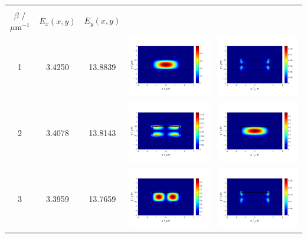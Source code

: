 \documentclass{assignment}
\begin{document}
\begin{sol}
\begin{itemize}
\begin{longtable}[c]{|c|c|c|c|c|}
              \begin{tabular}[c]{@{}c@{}}传播常数\\ $\beta$ / $\mu\mathrm{m}^{-1}$\end{tabular} &
              $E_x(x,y)$ &
              $E_y(x,y)$ \\ \hline
            \endhead
            1 & 3.4250 & 13.8839 & \includegraphics[width=.3\columnwidth]{Assignment-2-mode-1-Ex.png} & \includegraphics[width=.3\columnwidth]{Assignment-2-mode-1-Ey.png} \\ \hline
            2 & 3.4078 & 13.8143 & \includegraphics[width=.3\columnwidth]{Assignment-2-mode-2-Ex.png} & \includegraphics[width=.3\columnwidth]{Assignment-2-mode-2-Ey.png} \\ \hline
            3 & 3.3959 & 13.7659 & \includegraphics[width=.3\columnwidth]{Assignment-2-mode-3-Ex.png} & \includegraphics[width=.3\columnwidth]{Assignment-2-mode-3-Ey.png} \\ \hline

\end{longtable}
\end{itemize}
\end{sol}
\end{document}
